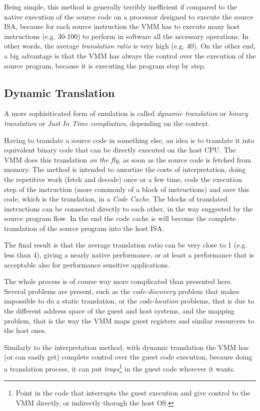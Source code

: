 Being simple, this method is generally terribly inefficient if compared to the native execution of the source code on a processor
designed to execute the source ISA, because for each source instruction the VMM has to execute many host instructions (e.g. 30-100)
to perform in software all the necessary operations. In other words, the average \emph{translation ratio} is very high (e.g. 40).
On the other end, a big advantage is that the VMM has always the control over the execution of the source program, because it is 
executing the program step by step.


\subsection{Dynamic Translation}
A more sophisiticated form of emulation is called \emph{dynamic translation} or \emph{binary translation} or 
\emph{Just In Time compliation}, depending on the context.

Having to translate a source code in something else, an idea is to translate it into equivalent binary code that can be directly
executed on the host CPU. The VMM does this translation \emph{on the fly}, as soon as the source code is fetched from memory.
The method is intended to amortize the costs of interpretation, doing the repetitive work (fetch and decode) once or a few time,
code the execution step of the instruction (more commonly of a block of instructions) and save this code, which is the translation,
in a \emph{Code Cache}. The blocks of translated instructions can be connected directly to each other, in the way suggested
by the source program flow. In the end the code cache is will become the complete translation of the source program into the
host ISA.

The final result is that the average translation ratio can be very close to 1 (e.g. less than 4), giving a nearly native performance,
or at least a performance that is acceptable also for performance sensitive applications.

The whole process is of course way more complicated than presented here. Several problems are present, such as the 
\emph{code-discovery} problem that makes impossible to do a static translation, or the \emph{code-location} problems, that is due
to the different address space of the guest and host systems, and the mapping problem, that is the way the VMM maps guest registers
and similar resourcers to the host ones.

Similarly to the interpretation method, with dynamic translation the VMM has (or can easily get) complete control over the guest code
execution, because doing a translation process, it can put \emph{traps}\footnote{Point in the code that interrupts the guest
execution and give control to the VMM directly, or indirectly thorugh the host OS.} in the guest code wherever it wants.

